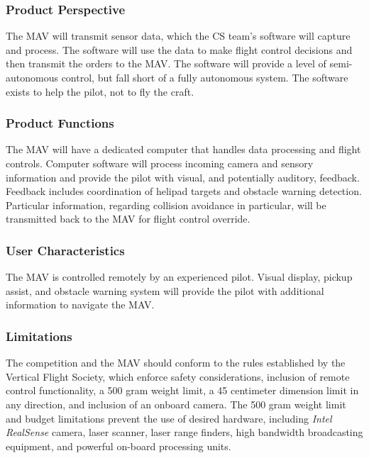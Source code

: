 \documentclass[onecolumn, oneside, letterpaper, draftclsnofoot, 10pt, compsoc]{IEEEtran}
\begin{document}
\subsubsection{Product Perspective}
The MAV will transmit sensor data, which the CS team’s software will capture and process. The software will use the data to make flight control decisions and then transmit the orders to the MAV. The software will provide a level of semi-autonomous control, but fall short of a fully autonomous system. The software exists to help the pilot, not to fly the craft.
\subsubsection{Product Functions}
The MAV will have a dedicated computer that handles data processing and flight controls. Computer software will process incoming camera and sensory information and provide the pilot with visual, and potentially auditory, feedback. Feedback includes coordination of helipad targets and obstacle warning detection. Particular information, regarding collision avoidance in particular, will be transmitted back to the MAV for flight control override.
\subsubsection{User Characteristics}
The MAV is controlled remotely by an experienced pilot. Visual display, pickup assist, and obstacle warning system will provide the pilot with additional information to navigate the MAV.

\subsubsection{Limitations}
The competition and the MAV should conform to the rules established by the Vertical Flight Society, which enforce safety considerations, inclusion of remote control functionality, a 500 gram weight limit, a 45 centimeter dimension limit in any direction, and inclusion of an onboard camera. The 500 gram weight limit and budget limitations prevent the use of desired hardware, including \textit{Intel RealSense} camera, laser scanner, laser range finders, high bandwidth broadcasting equipment, and powerful on-board processing units.
\end{document}

